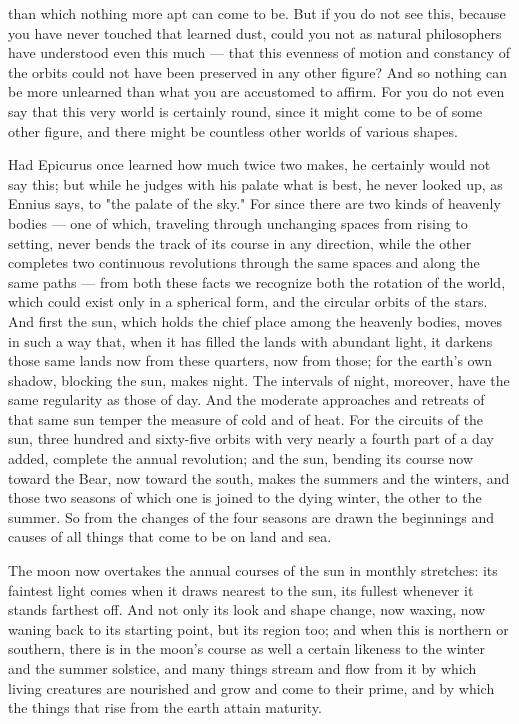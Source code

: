  than which nothing more apt can come to be. But if you do not see this, because you have never touched that learned dust, could you not as natural philosophers have understood even this much — that this evenness of motion and constancy of the orbits could not have been preserved in any other figure? And so nothing can be more unlearned than what you are accustomed to affirm. For you do not even say that this very world is certainly round, since it might come to be of some other figure, and there might be countless other worlds of various shapes.

 Had Epicurus once learned how much twice two makes, he certainly would not say this; but while he judges with his palate what is best, he never looked up, as Ennius says, to "the palate of the sky." For since there are two kinds of heavenly bodies — one of which, traveling through unchanging spaces from rising to setting, never bends the track of its course in any direction, while the other completes two continuous revolutions through the same spaces and along the same paths — from both these facts we recognize both the rotation of the world, which could exist only in a spherical form, and the circular orbits of the stars. And first the sun, which holds the chief place among the heavenly bodies, moves in such a way that, when it has filled the lands with abundant light, it darkens those same lands now from these quarters, now from those; for the earth's own shadow, blocking the sun, makes night. The intervals of night, moreover, have the same regularity as those of day. And the moderate approaches and retreats of that same sun temper the measure of cold and of heat. For the circuits of the sun, three hundred and sixty-five orbits with very nearly a fourth part of a day added, complete the annual revolution; and the sun, bending its course now toward the Bear, now toward the south, makes the summers and the winters, and those two seasons of which one is joined to the dying winter, the other to the summer. So from the changes of the four seasons are drawn the beginnings and causes of all things that come to be on land and sea.

 The moon now overtakes the annual courses of the sun in monthly stretches: its faintest light comes when it draws nearest to the sun, its fullest whenever it stands farthest off. And not only its look and shape change, now waxing, now waning back to its starting point, but its region too; and when this is northern or southern, there is in the moon's course as well a certain likeness to the winter and the summer solstice, and many things stream and flow from it by which living creatures are nourished and grow and come to their prime, and by which the things that rise from the earth attain maturity.

